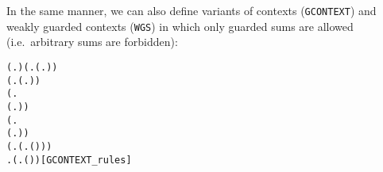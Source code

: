 In the same manner, we can also define variants of contexts (\texttt{GCONTEXT}) and weakly guarded
contexts (\texttt{WGS}) in which only guarded sums are allowed (i.e.~arbitrary sums are forbidden):
\begin{alltt}
\HOLTokenTurnstile{}  (\HOLTokenLambda{}. ) \HOLSymConst{\HOLTokenConj{}} (\HOLSymConst{\HOLTokenForall{}}.  (\HOLTokenLambda{}. )) \HOLSymConst{\HOLTokenConj{}}
   (\HOLSymConst{\HOLTokenForall{}} .   \HOLSymConst{\HOLTokenImp{}}  (\HOLTokenLambda{}.  )) \HOLSymConst{\HOLTokenConj{}}
   (\HOLSymConst{\HOLTokenForall{}}   .
          \HOLSymConst{\HOLTokenConj{}}   \HOLSymConst{\HOLTokenImp{}}
         (\HOLTokenLambda{}.   \HOLSymConst{\ensuremath{+}}  )) \HOLSymConst{\HOLTokenConj{}}
   (\HOLSymConst{\HOLTokenForall{}} .
          \HOLSymConst{\HOLTokenConj{}}   \HOLSymConst{\HOLTokenImp{}}  (\HOLTokenLambda{}.   \HOLSymConst{\ensuremath{\parallel}}  )) \HOLSymConst{\HOLTokenConj{}}
   (\HOLSymConst{\HOLTokenForall{}} .   \HOLSymConst{\HOLTokenImp{}}  (\HOLTokenLambda{}. \HOLSymConst{\ensuremath{\nu}}  ( ))) \HOLSymConst{\HOLTokenConj{}}
   \HOLSymConst{\HOLTokenForall{}} .   \HOLSymConst{\HOLTokenImp{}}  (\HOLTokenLambda{}.  ( ) )\hfill{[GCONTEXT_rules]}
\end{alltt}
